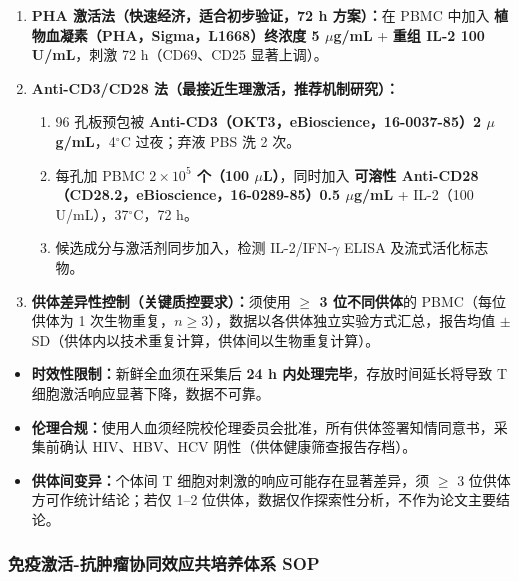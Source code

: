 \documentclass[12pt,a4paper,twoside]{article}
\begin{document}
\begin{enumerate}
  \item \textbf{PHA 激活法（快速经济，适合初步验证，72 h 方案）：}在 PBMC 中加入 \textbf{植物血凝素（PHA，Sigma，L1668）终浓度 5 $\mu$g/mL} + \textbf{重组 IL-2 100 U/mL}，刺激 72 h（CD69、CD25 显著上调）。
  \item \textbf{Anti-CD3/CD28 法（最接近生理激活，推荐机制研究）：}
  \begin{enumerate}
    \item 96 孔板预包被 \textbf{Anti-CD3（OKT3，eBioscience，16-0037-85）2 $\mu$g/mL}，4$^{\circ}$C 过夜；弃液 PBS 洗 2 次。
    \item 每孔加 PBMC \textbf{$2 \times 10^5$ 个（100 $\mu$L）}，同时加入 \textbf{可溶性 Anti-CD28（CD28.2，eBioscience，16-0289-85）0.5 $\mu$g/mL} + IL-2（100 U/mL），37$^{\circ}$C，72 h。
    \item 候选成分与激活剂同步加入，检测 IL-2/IFN-$\gamma$ ELISA 及流式活化标志物。
  \end{enumerate}
  \item \textbf{供体差异性控制（关键质控要求）：}须使用 \textbf{$\geq$ 3 位不同供体}的 PBMC（每位供体为 1 次生物重复，$n \geq 3$），数据以各供体独立实验方式汇总，报告均值 $\pm$ SD（供体内以技术重复计算，供体间以生物重复计算）。
\end{enumerate}

\begin{warningbox}
\begin{itemize}
  \item \textbf{时效性限制：}新鲜全血须在采集后 \textbf{24 h 内处理完毕}，存放时间延长将导致 T 细胞激活响应显著下降，数据不可靠。
  \item \textbf{伦理合规：}使用人血须经院校伦理委员会批准，所有供体签署知情同意书，采集前确认 HIV、HBV、HCV 阴性（供体健康筛查报告存档）。
  \item \textbf{供体间变异：}个体间 T 细胞对刺激的响应可能存在显著差异，须 $\geq$ 3 位供体方可作统计结论；若仅 1--2 位供体，数据仅作探索性分析，不作为论文主要结论。
\end{itemize}
\end{warningbox}

\subsubsection{免疫激活-抗肿瘤协同效应共培养体系 SOP}
\label{sec:coculture}
\end{document}
